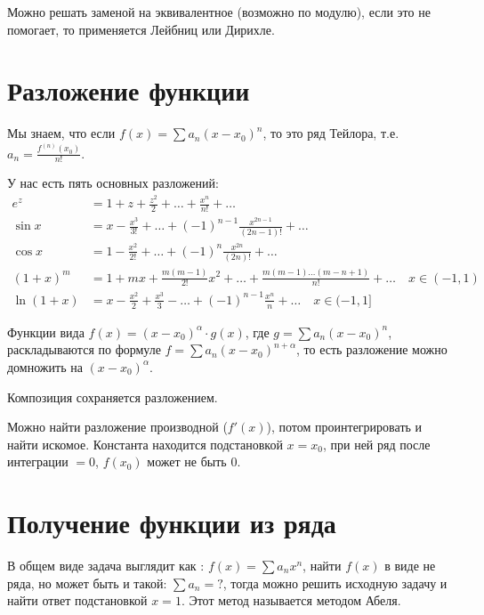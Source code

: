 Можно решать заменой на эквивалентное (возможно по модулю), если это не помогает, то применяется Лейбниц или Дирихле.

\section{Разложение функции}

Мы знаем, что если \(f(x) = \sum a_n(x - x_0)^n\), то это ряд Тейлора, т.е. \(a_n = \frac{f^{(n)} (x_0)}{n!} \).

У нас есть пять основных разложений:
\begin{align*}
    e^z        & = 1 + z + \frac{z^2}{2} + \dots + \frac{x^n}{n!} + \dots                                                    \\
    \sin x     & = x - \frac{x^3}{3!} + \dots + ( - 1)^{n - 1} \frac{x^{2n - 1}}{(2n - 1)!} + \dots                          \\
    \cos x     & = 1 - \frac{x^2}{2!} + \dots + ( - 1)^n \frac{x^{2n}}{(2n)!} + \dots                                        \\
    (1 + x)^m  & = 1 + mx + \frac{m(m - 1)}{2!}x^2 + \dots + \frac{m(m - 1)\dots(m - n + 1)}{n!} + \dots \quad x\in( - 1, 1) \\
    \ln(1 + x) & = x - \frac{x^2}{2} + \frac{x^3}{3} - \dots + ( - 1)^{n - 1}\frac{x^n}{n} + \dots \quad x\in( - 1, 1]
\end{align*}

Функции вида \(f(x) = (x - x_0)^\alpha \cdot g(x)\), где \(g = \sum a_n(x - x_0)^n\), раскладываются по формуле \(f = \sum a_n(x - x_0)^{n + \alpha}\), то есть разложение можно домножить на \((x - x_0)^\alpha\).

Композиция сохраняется разложением.

Можно найти разложение производной (\(f'(x)\)), потом проинтегрировать и найти искомое. Константа находится подстановкой \(x = x_0\), при ней ряд после интеграции \( = 0\), \(f(x_0)\) может не быть \(0\).

\section{Получение функции из ряда}

В общем виде задача выглядит как : \(f(x) = \sum a_nx^n\), найти \(f(x)\) в виде не ряда, но может быть и такой: \(\sum a_n = ?\), тогда можно решить исходную задачу и найти ответ подстановкой \(x = 1\). Этот метод называется методом Абеля.

